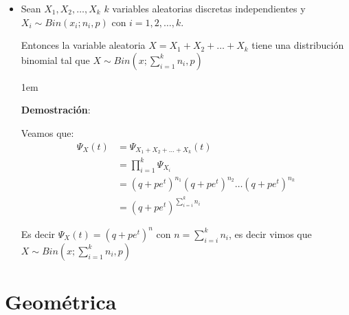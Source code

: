 \documentclass[12pt, fleqn]{report}                             %
\newenvironment{SmallIndentation}[1][0.75em]                    %
        {\begin{adjustwidth}{#1}{}\begin{footnotesize}}             %
        {\end{footnotesize}\end{adjustwidth}}                       %
\theoremstyle{break}                                            %
\newcommand{\Wrap}[1]           {\left( #1 \right)}             %
\begin{document}
                \begin{itemize}
                    
                    \item 
                        Sean $X_1, X_2, \dots, X_k$ $k$ variables aleatorias discretas independientes
                        y $X_i \sim Bin(x_i; n_i, p)$ con $i = 1, 2, \dots, k$.

                        Entonces la variable aleatoria $X = X_1 + X_2 + \dots + X_k$ tiene una 
                        distribución binomial tal que $X \sim Bin\Wrap{x; \sum_{i=1}^k n_i, p}$ 

                        \begin{SmallIndentation}[1em]
                            \textbf{Demostración}:
                            
                            Veamos que:
                            \begin{align*}
                                \Psi_X(t)
                                    &= \Psi_{X_1 + X_2 + \dots + X_k}(t)                        \\
                                    &= \prod_{i=1}^k \Psi_{X_i}                                 \\
                                    &= (q +pe^t)^{n_1}(q +pe^t)^{n_2} \dots (q +pe^t)^{n_k}     \\
                                    &= (q +pe^t)^{\sum_{i=i}^k n_i}
                            \end{align*}

                            Es decir $\Psi_X(t) = (q +pe^t)^n$ con $n = \sum_{i=i}^k n_i$, es decir
                            vimos que $X \sim Bin\Wrap{x; \sum_{i=1}^k n_i, p}$
                            
                        
                        \end{SmallIndentation}


                \end{itemize}


        \clearpage
        \section{Geométrica}
\end{document}
